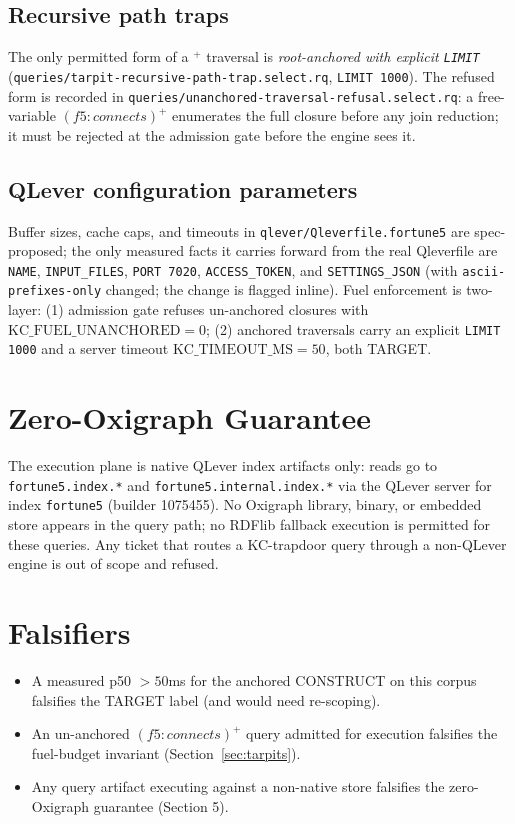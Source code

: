 \documentclass[11pt]{article}
\newcommand{\TARGET}{\textsf{TARGET}}
\begin{document}
\subsection{Recursive path traps}
The only permitted form of a $^{+}$ traversal is \emph{root-anchored with
explicit \texttt{LIMIT}} (\texttt{queries/tarpit-recursive-path-trap.select.rq},
\texttt{LIMIT 1000}). The refused form is recorded in
\texttt{queries/unanchored-traversal-refusal.select.rq}: a free-variable
$(f5:connects)^+$ enumerates the full closure before any join reduction;
it must be rejected at the admission gate before the engine sees it.

\subsection{QLever configuration parameters}
Buffer sizes, cache caps, and timeouts in
\texttt{qlever/Qleverfile.fortune5} are spec-proposed; the only measured
facts it carries forward from the real Qleverfile are \texttt{NAME},
\texttt{INPUT\_FILES}, \texttt{PORT 7020}, \texttt{ACCESS\_TOKEN}, and
\texttt{SETTINGS\_JSON} (with \texttt{ascii-prefixes-only} changed; the
change is flagged inline). Fuel enforcement is two-layer: (1) admission
gate refuses un-anchored closures with
$\mathrm{KC\_FUEL\_UNANCHORED} = 0$; (2) anchored traversals carry an
explicit \texttt{LIMIT 1000} and a server timeout
$\mathrm{KC\_TIMEOUT\_MS} = 50$, both \TARGET{}.

\section{Zero-Oxigraph Guarantee}

The execution plane is native QLever index artifacts only: reads go to
\texttt{fortune5.index.*} and \texttt{fortune5.internal.index.*} via the
QLever server for index \texttt{fortune5} (builder 1075455). No Oxigraph
library, binary, or embedded store appears in the query path; no RDFlib
fallback execution is permitted for these queries. Any ticket that routes
a KC-trapdoor query through a non-QLever engine is out of scope and
refused.

\section{Falsifiers}
\begin{itemize}
  \item A measured p50 $> 50$ms for the anchored CONSTRUCT on this corpus
        falsifies the \TARGET{} label (and would need re-scoping).
  \item An un-anchored $(f5:connects)^+$ query admitted for execution
        falsifies the fuel-budget invariant (Section~\ref{sec:tarpits}).
  \item Any query artifact executing against a non-native store falsifies
        the zero-Oxigraph guarantee (Section 5).
\end{itemize}
\end{document}
